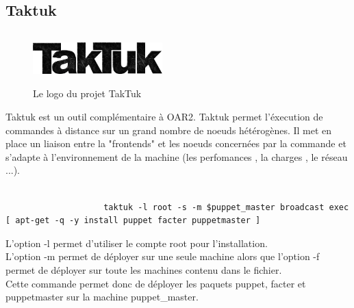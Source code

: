 \documentclass[a4paper, 10pt, onecolumn]{report}
\begin{document}
		\subsection{Taktuk}
		\begin{figure}[!h]
			\centering
   			\includegraphics[width=5cm,height=2cm]{TakTuk_Logo.png}
   			\caption{Le logo du projet TakTuk}
    		\label{fig:TakTuk}
		\end{figure} 
			Taktuk est un outil complémentaire à OAR2. Taktuk permet l'éxecution de commandes à distance sur un grand nombre de noeuds hétérogènes. Il met en place un liaison entre la "frontends" et les noeuds concernées par la commande et s'adapte  à l'environnement de la machine (les perfomances , la charges , le réseau ...). \\
			\\ 
			\begin{lstlisting}
					taktuk -l root -s -m $puppet_master broadcast exec [ apt-get -q -y install puppet facter puppetmaster ]
			\end{lstlisting}
			L'option -l permet d'utiliser le compte root pour l'installation.\\
			L'option -m permet de déployer sur une seule machine alors que l'option -f permet de déployer sur toute les machines contenu dans le fichier.\\
			Cette commande permet donc de déployer les paquets puppet, facter et puppetmaster sur la machine puppet\_master.
			
\end{document}
